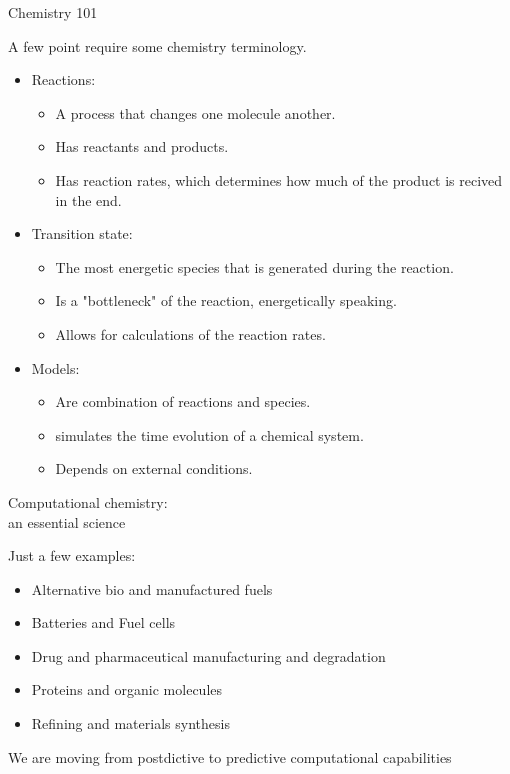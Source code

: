 \begin{frame}{Chemistry 101}

A few point require some chemistry terminology.

\vspace{0.5cm}
 \begin{itemize}

  \item Reactions:
  \begin{itemize}
  	\item A process that changes one molecule another.
  	\item Has reactants and products.
  	\item Has reaction rates, which determines how much of the product is recived in the end.
  \end{itemize}
  \item Transition state:
  \begin{itemize}

  	\item The most energetic species that is generated during the reaction.
  	\item Is a "bottleneck" of the reaction, energetically speaking.
  	\item Allows for calculations of the reaction rates.
  \end{itemize}
  \item Models:
  \begin{itemize}
  	\item Are combination of reactions and species.
  	\item simulates the time evolution of a chemical system.
  	\item Depends on external conditions.
  \end{itemize}
  

 \end{itemize}
 
\end{frame}


\begin{frame}{Computational chemistry:\\ an essential science}

Just a few examples:

\vspace{0.5cm}

 \begin{itemize}
  \item Alternative bio and manufactured fuels
  \item Batteries and Fuel cells
  \item Drug and pharmaceutical manufacturing and degradation
  \item Proteins and organic molecules
  \item Refining and materials synthesis
 \end{itemize}
 
 \vspace{0.5cm}
 
 We are moving from postdictive to predictive computational capabilities
 
\end{frame}

